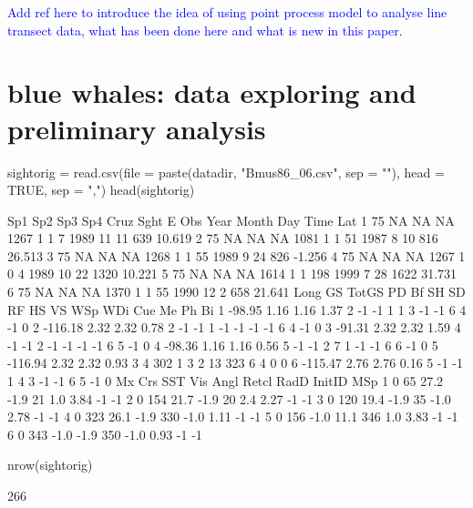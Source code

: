 \documentclass[a4paper]{article}\usepackage[]{graphicx}\usepackage[]{color}
\begin{document}
\textcolor{blue}{Add ref here to introduce the idea of using point process model to analyse line transect data, what has been done here and what is new in this paper. }


\section{blue whales: data exploring and preliminary analysis}



\begin{Schunk}
\begin{Sinput}
sightorig = read.csv(file = paste(datadir, "Bmus86_06.csv", sep = ""), 
    head = TRUE, sep = ",")
head(sightorig)
\end{Sinput}
\begin{Soutput}
  Sp1 Sp2 Sp3 Sp4 Cruz Sght E Obs Year Month Day Time    Lat
1  75  NA  NA  NA 1267    1 1   7 1989    11  11  639 10.619
2  75  NA  NA  NA 1081    1 1  51 1987     8  10  816 26.513
3  75  NA  NA  NA 1268    1 1  55 1989     9  24  826 -1.256
4  75  NA  NA  NA 1267    1 0   4 1989    10  22 1320 10.221
5  75  NA  NA  NA 1614    1 1 198 1999     7  28 1622 31.731
6  75  NA  NA  NA 1370    1 1  55 1990    12   2  658 21.641
     Long   GS TotGS   PD Bf SH  SD RF HS VS WSp WDi Cue Me Ph Bi
1  -98.95 1.16  1.16 1.37  2 -1  -1  1  1  3  -1  -1   6  4 -1  0
2 -116.18 2.32  2.32 0.78  2 -1  -1  1 -1 -1  -1  -1   6  4 -1  0
3  -91.31 2.32  2.32 1.59  4 -1  -1  2 -1 -1  -1  -1   6  5 -1  0
4  -98.36 1.16  1.16 0.56  5 -1  -1  2  7  1  -1  -1   6  6 -1  0
5 -116.94 2.32  2.32 0.93  3  4 302  1  3  2  13 323   6  4  0  0
6 -115.47 2.76  2.76 0.16  5 -1  -1  1  4  3  -1  -1   6  5 -1  0
  Mx Crs  SST  Vis Angl Retcl RadD InitID MSp
1  0  65 27.2 -1.9   21   1.0 3.84     -1  -1
2  0 154 21.7 -1.9   20   2.4 2.27     -1  -1
3  0 120 19.4 -1.9   35  -1.0 2.78     -1  -1
4  0 323 26.1 -1.9  330  -1.0 1.11     -1  -1
5  0 156 -1.0 11.1  346   1.0 3.83     -1  -1
6  0 343 -1.0 -1.9  350  -1.0 0.93     -1  -1
\end{Soutput}
\begin{Sinput}
nrow(sightorig)
\end{Sinput}
\begin{Soutput}
[1] 266
\end{Soutput}

\end{Schunk}
\end{document}
